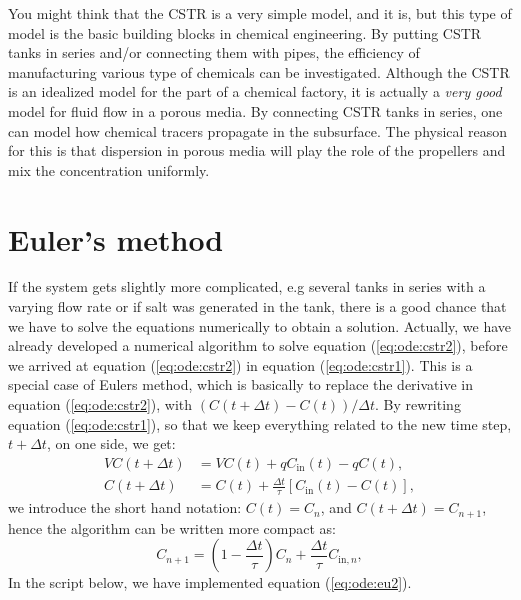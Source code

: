 \documentclass[graybox,sectrefs,envcountresetchap,open=right,final]{svmonodo}
\newenvironment{graybox2admon}[1][]{
\begin{graybox2mdframed}[frametitle=#1]
}
{
\end{graybox2mdframed}
}
\begin{document}
\begin{graybox2admon}[The CSTR]
You might think that the CSTR is a very simple model, and it is, but this type of model is the basic building blocks in chemical engineering.
By putting CSTR tanks in series and/or connecting them with pipes, the efficiency of manufacturing various type of chemicals
can be investigated. Although the CSTR is an idealized model for the part of a chemical factory, it is actually a \emph{very good} model 
for fluid flow in a porous media. By connecting CSTR tanks in series, one can model how chemical tracers propagate in the subsurface. 
The physical reason for this is that dispersion in porous media will play the role of the propellers and mix the concentration
uniformly.
\end{graybox2admon}




\section{Euler's method}
If the system gets slightly more complicated, e.g several tanks in series with a varying flow rate or if salt was generated in the tank, there is a
good chance that we have to solve the equations numerically to obtain a solution.
Actually, we have already developed a numerical algorithm to solve equation (\ref{eq:ode:cstr2}), 
before we arrived at equation (\ref{eq:ode:cstr2}) in equation (\ref{eq:ode:cstr1}). This is a special case of Eulers method, which is basically to 
replace the derivative in equation (\ref{eq:ode:cstr2}), with $(C(t+\Delta t)-C(t))/\Delta t$. By rewriting equation (\ref{eq:ode:cstr1}), so that we
keep everything related to the new time step, $t+\Delta t$, on one side, we get:
\begin{align}
VC(t+\Delta t) &= VC(t) + qC_\text{in}(t) - qC(t),\label{eq:ode:eu0}\\ 
C(t+\Delta t) &= C(t) + \frac{\Delta t}{\tau}\left[C_\text{in}(t) - C(t)\right]\label{eq:ode:eu1},
\end{align}
we introduce the short hand notation: $C(t)=C_n$, and $C(t+\Delta t)=C_{n+1}$, hence the algorithm can be written more compact as:
\begin{equation}
C_{n+1} = \left(1-\frac{\Delta t}{\tau}\right)C_n + \frac{\Delta t}{\tau}C_{\text{in},n}\label{eq:ode:eu2},
\end{equation}
In the script below, we have implemented equation (\ref{eq:ode:eu2}).
\end{document}
